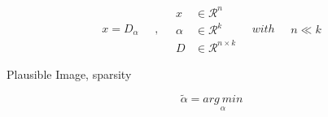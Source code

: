 \begin{equation}\label{intro:sparseland}
\begin{split}
x  =  D_{\alpha}
\end{split}
\quad , \quad
\begin{split}
x &\in \mathcal{R}^n\\
\alpha &\in \mathcal{R}^k\\
D &\in \mathcal{R}^{n \times k}
\end{split}
\quad with \quad
\begin{split}
n \ll k
\end{split}
\end{equation}

Plausible Image, sparsity

\begin{equation}\label{cs:noiseless}
\tilde{\alpha} =  \underset{\alpha}{arg\: min}
\end{equation}

